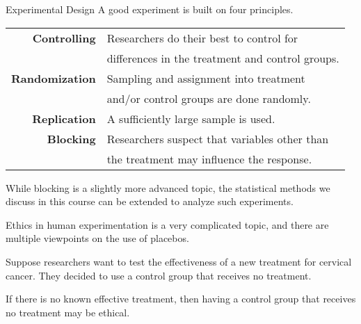\documentclass{beamer}
\begin{document}
\begin{frame}
\begin{block}{Experimental Design}
A good experiment is built on four principles.

\begin{tabular}{rl}
\textbf{Controlling} & Researchers do their best to control for\\
& differences in the treatment and control groups. \\
\textbf{Randomization} & Sampling and assignment into treatment \\
& and/or control groups are done randomly. \\
\textbf{Replication} & A sufficiently large sample is used. \\
\textbf{Blocking} & Researchers suspect that variables other than \\
& the treatment may influence the response.
\end{tabular}
\end{block}\pause

\begin{note}
While blocking is a slightly more advanced topic, the statistical methods we discuss in this course can be extended to analyze such experiments.
\end{note}
\end{frame}

\begin{frame}
\begin{note}
Ethics in human experimentation is a very complicated topic, and there are multiple viewpoints on the use of placebos.
\end{note}\pause

\begin{example}
Suppose researchers want to test the effectiveness of a new treatment for cervical cancer. They decided to use a control group that receives no treatment.

\vspace{1mm}
\pause
{}
\end{example}\pause

\begin{note}
If there is no known effective treatment, then having a control group that receives no treatment may be ethical.
\end{note}
\end{frame}
\end{document}
